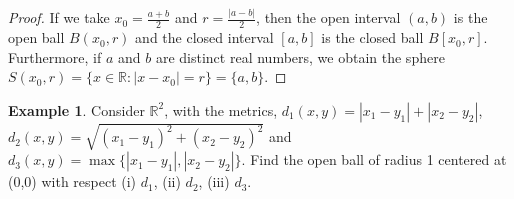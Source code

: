 \documentclass[11pt,a4paper]{article}
\theoremstyle{definition}
\newtheorem{exa}[thm]{Example}
\begin{document}
\begin{proof}
If we take $x_0=\frac{a+b}{2}$ and $r=\frac{|a-b|}{2}$, then the open interval $(a,b)$ is the open ball $B(x_0,r)$ and the closed interval $[a,b]$ is the closed ball $B[x_0,r]$.  Furthermore, if $a$ and $b$ are distinct real numbers, we obtain the sphere $S(x_0,r)=\{x\in \mathbb{R}:|x-x_0|=r\}=\{a,b\}$.
\end{proof}


\begin{exa}
Consider $\mathbb{R}^2$, with the metrics, $d_1(x,y)=|x_1-y_1|+|x_2-y_2|$,\\ $d_2(x,y)=\sqrt{(x_1-y_1)^2+(x_2-y_2)^2}$ and $d_3(x,y)=\max\{|x_1-y_1|,|x_2-y_2|\}$. Find the open ball of radius 1 centered at (0,0) with respect (i) $d_1$, (ii) $d_2$, (iii) $d_3$.
\end{exa}
\end{document}
